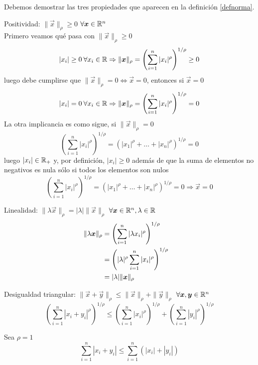 \begin{demostracion}
Debemos demostrar las tres propiedades que aparecen en la definici\'on \ref{defnorma}.

Positividad: $\| \vec{x} \|_{\rho} \geq 0$ $\forall \vec{x} \in \R^n$
\\Primero veamos qu\'e pasa con $\| \vec{x} \|_{\rho} \geq 0$
$$|x_i|\geq 0 \:\forall x_i \in \R \Rightarrow \|\vec{x}\|_\rho =\left(\sum_{i=1}^n |x_i|^{\rho} \right)^{1/\rho} \geq 0$$ 
luego debe cumplirse que $\| \vec{x} \|_{\rho} = 0 \Leftrightarrow \vec{x}=0$, entonces si $\vec{x}=0$
$$|x_i|= 0 \:\forall x_i \in \R \Rightarrow \|\vec{x}\|_\rho =\left(\sum_{i=1}^n |x_i|^{\rho} \right)^{1/\rho} = 0 $$
La otra implicancia es como sigue, si $\|\vec{x}\|_\rho =0$
$$\left(\sum_{i=1}^n |x_i|^{\rho} \right)^{1/\rho} = (|x_1|^{\rho} + \ldots + |x_n|^{\rho})^{1/\rho} = 0$$
luego $|x_i| \in \R_+$ y, por definici\'on, $|x_i|\geq 0$ adem\'as de que la suma de elementos no negativos es nula s\'olo si todos los elementos son nulos 
$$\left(\sum_{i=1}^n |x_i|^{\rho} \right)^{1/\rho} = (|x_1|^{\rho} + \ldots + |x_n|^{\rho})^{1/\rho} = 0 \Rightarrow \vec{x} = 0$$

Linealidad: $\|\lambda \vec{x} \|_{\rho} = |\lambda| \|\vec{x}\|_{\rho}$ $\forall \vec{x} \in \R^n, \lambda \in \R$
\begin{align*}
\|\lambda \vec{x} \|_{\rho} &= \left(\sum_{i=1}^n |\lambda x_i|^{\rho} \right)^{1/\rho} \cr
                      &= \left(|\lambda|^{\rho} \sum_{i=1}^n |x_i|^{\rho} \right)^{1/\rho} \cr
                      &= |\lambda| \|\vec{x}\|_{\rho}
\end{align*}
 
Desigualdad triangular: $\|\vec{x}+\vec{y}\|_{\rho} \leq \|\vec{x}\|_{\rho} + \|\vec{y}\|_{\rho}$ $\forall \vec{x},\vec{y} \in \R^n$
$$\left(\sum_{i=1}^n |x_i + y_i|^{\rho} \right)^{1/\rho} \leq \left(\sum_{i=1}^n |x_i|^{\rho} \right)^{1/\rho} + \left(\sum_{i=1}^n |y_i|^{\rho} \right)^{1/\rho}$$

Sea $\rho=1$
$$\sum_{i=1}^n |x_i+y_i| \leq \sum_{i=1}^n \left( |x_i| + |y_i| \right)$$


\end{demostracion}
